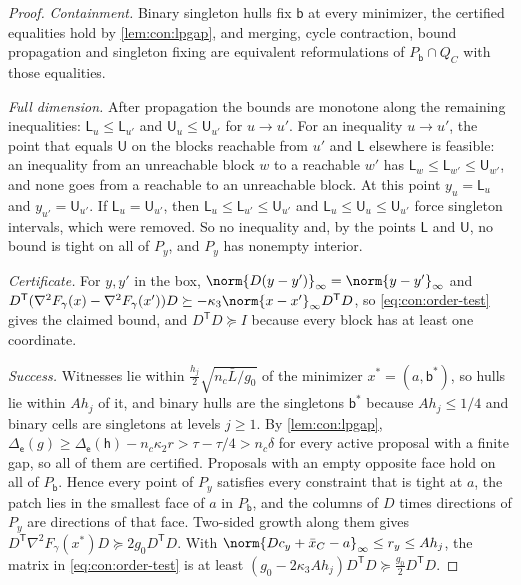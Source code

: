\begin{proof}
\emph{Containment.} Binary singleton hulls fix $\mathsf b$ at every minimizer,
the certified equalities hold by \cref{lem:con:lpgap}, and merging, cycle
contraction, bound propagation and singleton fixing are equivalent
reformulations of $P_{\mathsf b}\cap Q_C$ with those equalities.

\emph{Full dimension.} After propagation the bounds are monotone along the
remaining inequalities: $\mathsf L_u\le\mathsf L_{u'}$ and $\mathsf U_u\le\mathsf
U_{u'}$ for $u\to u'$. For an inequality $u\to u'$, the point that equals
$\mathsf U$ on the blocks reachable from $u'$ and $\mathsf L$ elsewhere is
feasible: an inequality from an unreachable block $w$ to a reachable $w'$
has $\mathsf L_w\le\mathsf L_{w'}\le\mathsf U_{w'}$, and none goes from a
reachable to an unreachable block. At this point $y_u=\mathsf L_u$ and
$y_{u'}=\mathsf U_{u'}$. If $\mathsf L_u=\mathsf U_{u'}$, then
$\mathsf L_u\le\mathsf L_{u'}\le\mathsf U_{u'}$ and
$\mathsf L_u\le\mathsf U_u\le\mathsf U_{u'}$ force singleton intervals, which
were removed. So no inequality and, by the points $\mathsf L$ and $\mathsf U$,
no bound is tight on all of $P_y$, and $P_y$ has nonempty interior.

\emph{Certificate.} For $y,y'$ in the box,
$\norm{D(y-y')}_\infty=\norm{y-y'}_\infty$ and
$D^{\mathsf T}(\nabla^2F_\gamma(x)-\nabla^2F_\gamma(x'))D\succeq-\kappa_3\norm{x-x'}_\infty
D^{\mathsf T}D$, so \eqref{eq:con:order-test} gives the claimed bound, and
$D^{\mathsf T}D\succeq I$ because every block has at least one coordinate.

\emph{Success.} Witnesses lie within $\frac{h_j}2\sqrt{n_c\bar L/g_0}$ of the
minimizer $x^*=(a,\mathsf b^*)$, so hulls lie within $Ah_j$ of it, and binary
hulls are the singletons $\mathsf b^*$ because $Ah_j\le1/4$ and binary cells
are singletons at levels $j\ge1$. By \cref{lem:con:lpgap},
$\Delta_{\mathsf e}(g)\ge\Delta_{\mathsf e}(\mathsf h)-n_c\kappa_2r>\tau-\tau/4
>n_c\delta$ for every active proposal with a finite gap, so all of them are
certified. Proposals with an empty opposite face hold on all of
$P_{\mathsf b}$. Hence every point of $P_y$ satisfies every constraint that is
tight at $a$, the patch lies in the smallest face of $a$ in $P_{\mathsf b}$,
and the columns of $D$ times directions of $P_y$ are directions of that face.
Two-sided growth along them gives
$D^{\mathsf T}\nabla^2F_\gamma(x^*)D\succeq2g_0D^{\mathsf T}D$. With
$\norm{Dc_y+\bar x_C-a}_\infty\le r_y\le Ah_j$, the matrix in
\eqref{eq:con:order-test} is at least
$(g_0-2\kappa_3Ah_j)D^{\mathsf T}D\succeq\frac{g_0}2D^{\mathsf T}D$.
\end{proof}


